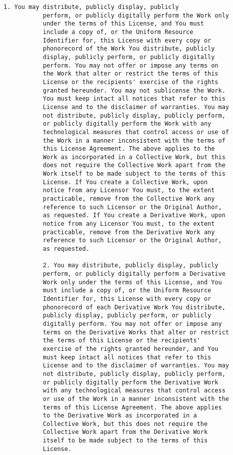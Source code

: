 \begin{Verbatim}[fontsize=\scriptsize]
           1. You may distribute, publicly display, publicly
           perform, or publicly digitally perform the Work only
           under the terms of this License, and You must
           include a copy of, or the Uniform Resource
           Identifier for, this License with every copy or
           phonorecord of the Work You distribute, publicly
           display, publicly perform, or publicly digitally
           perform. You may not offer or impose any terms on
           the Work that alter or restrict the terms of this
           License or the recipients' exercise of the rights
           granted hereunder. You may not sublicense the Work.
           You must keep intact all notices that refer to this
           License and to the disclaimer of warranties. You may
           not distribute, publicly display, publicly perform,
           or publicly digitally perform the Work with any
           technological measures that control access or use of
           the Work in a manner inconsistent with the terms of
           this License Agreement. The above applies to the
           Work as incorporated in a Collective Work, but this
           does not require the Collective Work apart from the
           Work itself to be made subject to the terms of this
           License. If You create a Collective Work, upon
           notice from any Licensor You must, to the extent
           practicable, remove from the Collective Work any
           reference to such Licensor or the Original Author,
           as requested. If You create a Derivative Work, upon
           notice from any Licensor You must, to the extent
           practicable, remove from the Derivative Work any
           reference to such Licensor or the Original Author,
           as requested.
        
           2. You may distribute, publicly display, publicly
           perform, or publicly digitally perform a Derivative
           Work only under the terms of this License, and You
           must include a copy of, or the Uniform Resource
           Identifier for, this License with every copy or
           phonorecord of each Derivative Work You distribute,
           publicly display, publicly perform, or publicly
           digitally perform. You may not offer or impose any
           terms on the Derivative Works that alter or restrict
           the terms of this License or the recipients'
           exercise of the rights granted hereunder, and You
           must keep intact all notices that refer to this
           License and to the disclaimer of warranties. You may
           not distribute, publicly display, publicly perform,
           or publicly digitally perform the Derivative Work
           with any technological measures that control access
           or use of the Work in a manner inconsistent with the
           terms of this License Agreement. The above applies
           to the Derivative Work as incorporated in a
           Collective Work, but this does not require the
           Collective Work apart from the Derivative Work
           itself to be made subject to the terms of this
           License.
        

\end{Verbatim}
